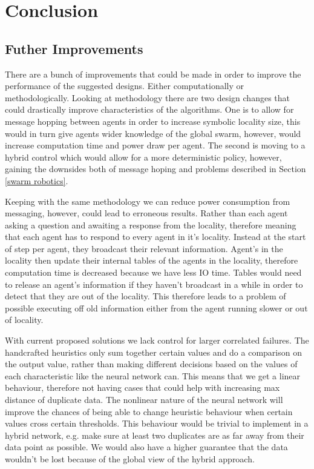 \documentclass{UoYCSproject}
\begin{document}

\chapter{Conclusion}
\label{cha:conclusion}

\section{Futher Improvements}
\label{sec:further}

There are a bunch of improvements that could be made in order to improve the performance of the suggested designs. 
Either computationally or methodologically.
Looking at methodology there are two design changes that could drastically improve characteristics of the algorithms. 
One is to allow for message hopping between agents in order to increase symbolic locality size, this would in turn give agents wider knowledge of the global swarm, however, would increase computation time and power draw per agent. 
The second is moving to a hybrid control which would allow for a more deterministic policy, however, gaining the downsides both of message hoping and problems described in Section \ref{swarm robotics}.

Keeping with the same methodology we can reduce power consumption from messaging, however, could lead to erroneous results. 
Rather than each agent asking a question and awaiting a response from the locality, therefore meaning that each agent has to respond to every agent in it’s locality. 
Instead at the start of step per agent, they broadcast their relevant information. 
Agent’s in the locality then update their internal tables of the agents in the locality, therefore computation time is decreased because we have less IO time. 
Tables would need to release an agent's information if they haven’t broadcast in a while in order to detect that they are out of the locality. 
This therefore leads to a problem of possible executing off old information either from the agent running slower or out of locality.

With current proposed solutions we lack control for larger correlated failures. 
The handcrafted heuristics only sum together certain values and do a comparison on the output value, rather than making different decisions based on the values of each characteristic like the neural network can. 
This means that we get a linear behaviour, therefore not having cases that could help with increasing max distance of duplicate data. 
The nonlinear nature of the neural network will improve the chances of being able to change heuristic behaviour when certain values cross certain thresholds. 
This behaviour would be trivial to implement in a hybrid network, e.g. make sure at least two duplicates are as far away from their data point as possible. 
We would also have a higher guarantee that the data wouldn’t be lost because of the global view of the hybrid approach.
\end{document}
